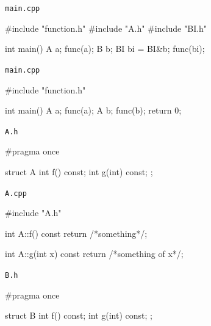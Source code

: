 \newsavebox\mainb
\begin{lrbox}{\mainb}%
\begin{minipage}[\baselineskip]{\codewidth}
\texttt{main.cpp}
\begin{cppcode}[numbers = none]
#include "function.h"
#include "A.h"
#include "BI.h"

int main() {
  A a;
  func(a);
  B b;
  BI bi = BI{&b};
  func(bi);
}
\end{cppcode}
\end{minipage}%
\end{lrbox}

\newsavebox\mainc
\begin{lrbox}{\mainc}%
\begin{minipage}[\baselineskip]{\codewidth}
\texttt{main.cpp}
\begin{cppcode}[numbers = none]
#include "function.h"

int main() {
  A a;
  func(a);
  A b;
  func(b);
  return 0;
}
\end{cppcode}
\end{minipage}%
\end{lrbox}

\newsavebox\classAh
\begin{lrbox}{\classAh}%
\begin{minipage}[\baselineskip]{\codewidth}
\texttt{A.h}
\begin{cppcode}[numbers = none]
#pragma once

struct A {
  int f() const;
  int g(int) const;
};
\end{cppcode}
\end{minipage}%
\end{lrbox}

\newsavebox\classAcpp
\begin{lrbox}{\classAcpp}%
\begin{minipage}[\baselineskip]{\codewidth}
\texttt{A.cpp}
\begin{cppcode}[numbers = none]
#include "A.h"

int A::f() const {
  return /*something*/;
}

int A::g(int x) const {
  return /*something of x*/;
}
\end{cppcode}
\end{minipage}%
\end{lrbox}

\newsavebox\classBh
\begin{lrbox}{\classBh}%
\begin{minipage}[\baselineskip]{\codewidth}
\texttt{B.h}
\begin{cppcode}[numbers = none]
#pragma once

struct B {
  int f() const;
  int g(int) const;
};
\end{cppcode}
\end{minipage}%
\end{lrbox}

